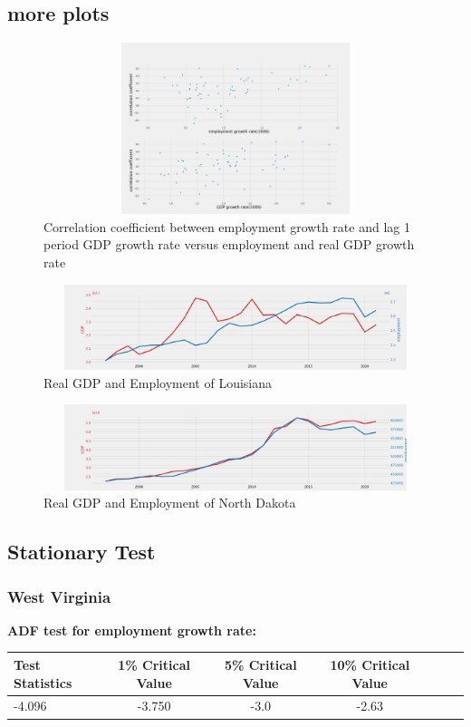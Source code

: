 \documentclass{article}
\begin{document}
\subsection{more plots}
\begin{figure}[h]
	\centering
	\includegraphics[width=12cm, height=5cm]{res/corr.png}
	\caption{
        Correlation coefficient between employment growth rate and lag 1 period GDP growth rate
        versus employment and real GDP growth rate
    }
\end{figure}

\begin{figure}[h]
	\centering
	\includegraphics[width=12cm, height=2.5cm]{res/la.png}
	\caption{Real GDP and Employment of Louisiana}
\end{figure}

\begin{figure}[h]
	\centering
	\includegraphics[width=12cm, height=2.5cm]{res/nd.png}
	\caption{Real GDP and Employment of North Dakota}
\end{figure}

\newpage

\subsection{Stationary Test}
\vspace{0.5cm}
\subsubsection{West Virginia}
\noindent \textbf{ADF test for employment growth rate: }
\begin{center}
    \resizebox{13cm}{!}
    {
    \begin{tabular}{lcccccc} \hline
        Test Statistics & 1\% Critical Value& 5\% Critical Value & 10\% Critical Value \\ \hline
        -4.096 & -3.750 & -3.0 & -2.63 \\ \hline
    \end{tabular}
    }
\end{center}
\end{document}
